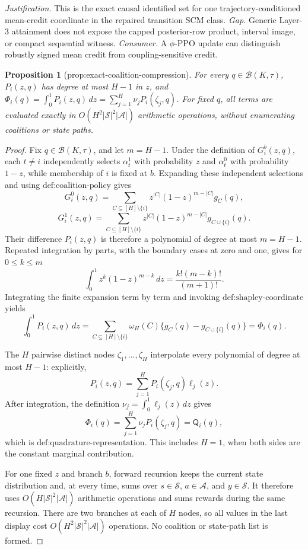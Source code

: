 \documentclass{article}
\newtheorem{proposition}{Proposition}
\begin{document}
\par\smallskip\noindent \textit{Justification.} This is the exact causal identified set for one trajectory-conditioned mean-credit coordinate in the repaired transition SCM class. \textit{Gap.} Generic Layer-3 attainment does not expose the capped posterior-row product, interval image, or compact sequential witness. \textit{Consumer.} A \(\phi\)-PPO update can distinguish robustly signed mean credit from coupling-sensitive credit.

\begin{proposition}[prop:exact-coalition-compression]\label{prop:exact-coalition-compression}
For every \(q\in\mathcal B(K,\tau)\), \(P_i(z,q)\) has degree at most \(H-1\) in \(z\), and \(\Phi_i(q)=\int_0^1P_i(z,q)\,dz=\sum_{j=1}^H\nu_jP_i(\zeta_j,q)\). For fixed \(q\), all terms are evaluated exactly in \(O(H^2|\mathcal S|^2|\mathcal A|)\) arithmetic operations, without enumerating coalitions or state paths.
\end{proposition}
\begin{proof}
Fix \(q\in\mathcal B(K,\tau)\), and let \(m=H-1\).  Under the definition of \(G_i^b(z,q)\), each \(t\ne i\) independently selects \(\alpha_t^1\) with probability \(z\) and \(\alpha_t^0\) with probability \(1-z\), while membership of \(i\) is fixed at \(b\).  Expanding these independent selections and using \(\text{def:coalition-policy}\) gives
\[
 G_i^0(z,q)=\sum_{C\subseteq[H]\setminus\{i\}}
 z^{|C|}(1-z)^{m-|C|}g_C(q),
\]
\[
 G_i^1(z,q)=\sum_{C\subseteq[H]\setminus\{i\}}
 z^{|C|}(1-z)^{m-|C|}g_{C\cup\{i\}}(q).
\]
Their difference \(P_i(z,q)\) is therefore a polynomial of degree at most \(m=H-1\).  Repeated integration by parts, with the boundary cases at zero and one, gives for \(0\le k\le m\)
\[
 \int_0^1 z^k(1-z)^{m-k}\,dz
 =\frac{k!(m-k)!}{(m+1)!}.
\]
Integrating the finite expansion term by term and invoking \(\text{def:shapley-coordinate}\) yields
\[
 \int_0^1P_i(z,q)\,dz
 =\sum_{C\subseteq[H]\setminus\{i\}}
 \omega_H(C)\{g_C(q)-g_{C\cup\{i\}}(q)\}
 =\Phi_i(q).
\]

The \(H\) pairwise distinct nodes \(\zeta_1,\ldots,\zeta_H\) interpolate every polynomial of degree at most \(H-1\): explicitly,
\[
 P_i(z,q)=\sum_{j=1}^H P_i(\zeta_j,q)\ell_j(z).
\]
After integration, the definition \(\nu_j=\int_0^1\ell_j(z)\,dz\) gives
\[
 \Phi_i(q)=\sum_{j=1}^H\nu_jP_i(\zeta_j,q)=\mathsf Q_i(q),
\]
which is \(\text{def:quadrature-representation}\).  This includes \(H=1\), when both sides are the constant marginal contribution.

For one fixed \(z\) and branch \(b\), forward recursion keeps the current state distribution and, at every time, sums over \(s\in\mathcal S\), \(a\in\mathcal A\), and \(y\in\mathcal S\).  It therefore uses \(O(H|\mathcal S|^2|\mathcal A|)\) arithmetic operations and sums rewards during the same recursion.  There are two branches at each of \(H\) nodes, so all values in the last display cost \(O(H^2|\mathcal S|^2|\mathcal A|)\) operations.  No coalition or state-path list is formed.
\end{proof}
\end{document}

